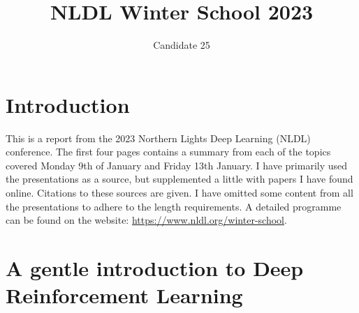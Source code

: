 \documentclass[10pt,twocolumn,letterpaper]{article}
\begin{document}
\title{NLDL Winter School 2023}

\author{Candidate 25}
\maketitle

\section{Introduction} \label{sec:intro}
This is a report from the 2023 Northern Lights Deep Learning (NLDL) conference. The first four pages contains a summary from each of the topics covered Monday 9th of January and Friday 13th January. I have primarily used the presentations as a source, but supplemented a little with papers I have found online. Citations to these sources are given. 
I have omitted some content from all the presentations to adhere to the length requirements. A detailed programme can be found on the website: \href{https://www.nldl.org/winter-school}{https://www.nldl.org/winter-school}. 

\section{A gentle introduction to Deep Reinforcement Learning}\label{sec:drl}

\end{document}
